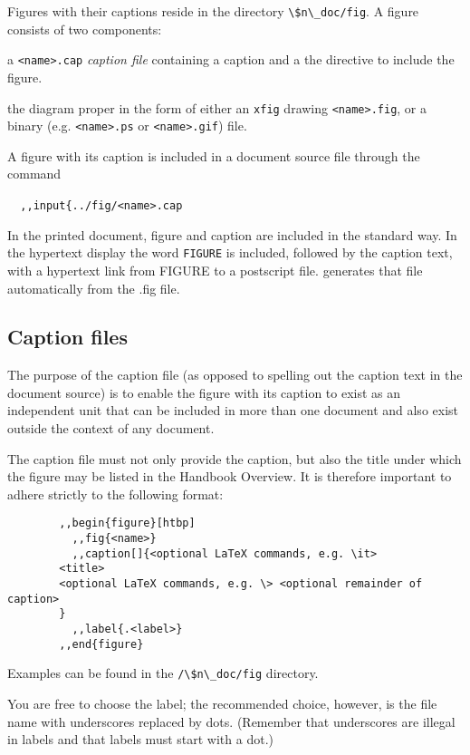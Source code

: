         Figures with their captions reside in the directory 
\verb:\$n\_doc/fig:. A figure consists of two components: 
\bi 

\item   a \verb:<name>.cap: {\em caption file} containing a caption and a the
directive to include the figure. 

\item   the diagram proper in the form of either an \verb/xfig/ drawing 
\verb:<name>.fig:, or a binary (e.g. \verb/<name>.ps/ or \verb/<name>.gif/)
file. 
\ei 

        A figure with its caption is included in a document source file through
the command 

\verb:  ,,input{../fig/<name>.cap: \ 

In the printed document, figure and caption are included in the standard way.
In the hypertext display the word \verb/FIGURE/ is included, followed by the
caption text, with a hypertext link from FIGURE to a postscript file. \ndoc
generates that file automatically from the .fig file. 


\subsection{ Caption files} 
\label{.caption} 

        The purpose of the caption file (as opposed to spelling out the caption
text in the document source) is to enable the figure with its caption to exist
as an independent unit that can be included in more than one document and also
exist outside the context of any document. 

        The caption file must not only provide the caption, but also the title
under which the figure may be listed in the Handbook Overview. It is therefore
important to adhere strictly to the following format: 


\begin{verbatim} 
        ,,begin{figure}[htbp] 
          ,,fig{<name>} 
          ,,caption[]{<optional LaTeX commands, e.g. \it> 
        <title> 
        <optional LaTeX commands, e.g. \> <optional remainder of caption> 
        } 
          ,,label{.<label>} 
        ,,end{figure} 
\end{verbatim} 

\noi Examples can be found in the 
\verb:/\$n\_doc/fig: directory. 

        You are free to choose the label; the recommended choice, however, is
the file name with underscores replaced by dots. (Remember that underscores are
illegal in labels and that labels must start with a dot.) 

